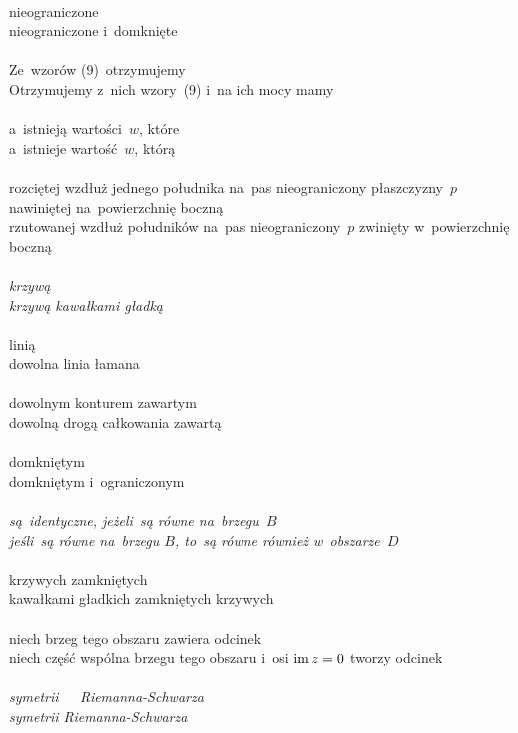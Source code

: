 \documentclass[a4paper,11pt]{article}
\numberwithin{equation}{section}
\begin{document}
\VerSpaceTwo


\noindent
{} \\
\Jest nieograniczone \\
\PowinnoByc nieograniczone i~domknięte \\
 \\
\Jest Ze~wzorów (9)~otrzymujemy \\
\PowinnoByc Otrzymujemy z~nich wzory~(9) i~na ich mocy mamy \\
 \\
\Jest a~istnieją wartości~$w$, które \\
\PowinnoByc a~istnieje wartość~$w$, którą \\
 \\
\Jest rozciętej wzdłuż jednego południka na~pas nieograniczony
płaszczyzny~$p$ nawiniętej na~powierzchnię boczną \\
\PowinnoByc rzutowanej wzdłuż południków na~pas nieograniczony~$p$ zwinięty
w~powierzchnię boczną \\
 \\
\Jest \textit{krzywą} \\
\PowinnoByc \textit{krzywą kawałkami gładką} \\
 \\
\Jest linią \\
\PowinnoByc dowolna linia łamana \\
 \\
\Jest dowolnym konturem zawartym \\
\PowinnoByc dowolną drogą całkowania zawartą \\
 \\
\Jest domkniętym \\
\PowinnoByc domkniętym i~ograniczonym \\
 \\
\Jest \textit{są~identyczne, jeżeli~są równe na~brzegu~$B$} \\
\PowinnoByc \textit{jeśli~są równe na~brzegu $B$, to~są równe również
  w~obszarze~$D$} \\
 \\
\Jest krzywych zamkniętych \\
\PowinnoByc kawałkami gładkich zamkniętych krzywych \\
 \\
\Jest niech brzeg tego obszaru zawiera odcinek \\
\PowinnoByc niech część wspólna brzegu tego obszaru i~osi
$\operatorname{im} z = 0$ tworzy odcinek \\
 \\
\Jest \textit{symetrii~~~Riemanna-Schwarza} \\
\PowinnoByc \textit{symetrii Riemanna-Schwarza}
\end{document}
